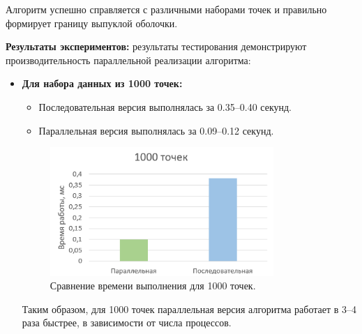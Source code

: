 \documentclass[a4paper,12pt]{article}
\begin{document}
Алгоритм успешно справляется с различными наборами точек и правильно формирует границу выпуклой оболочки.


\textbf{Результаты экспериментов:}
результаты тестирования демонстрируют производительность параллельной реализации алгоритма:

\begin{itemize}
    \item \textbf{Для набора данных из 1000 точек:}
    \begin{itemize}
        \item Последовательная версия выполнялась за 0.35–0.40 секунд.
        \item Параллельная версия выполнялась за 0.09–0.12 секунд.
    \end{itemize}
    \begin{figure}[H]
    	\centering
    	\includegraphics[width=0.8\textwidth]{images/compare_1000.jpg} 
    	\caption{Сравнение времени выполнения для 1000 точек.}
    	\label{fig:compare_1000}
    \end{figure}	
    Таким образом, для 1000 точек параллельная версия алгоритма работает в 3–4 раза быстрее, в зависимости от числа процессов.
    

\end{itemize}
\end{document}
